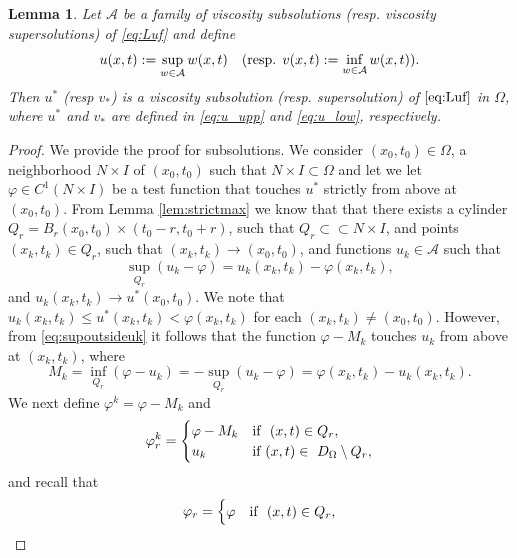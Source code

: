 \documentclass[11pt]{article}
\providecommand{\Ns}{N \times I}
\providecommand{\Rnp}{D_{\Omega}}
\newtheorem{lem}[thm]{Lemma}
\numberwithin{equation}{section}
\theoremstyle{definition}
\begin{document}
\begin{lem}\label{lem:supsubissub}
    Let $\mathcal{A}$ be a family of viscosity subsolutions (resp. viscosity supersolutions) of \eqref{eq:Luf} and define 
    \begin{equation}\label{eq:sup_u}
        u(x,t):= \sup_{w \in \mathcal{A}} w(x,t) \quad (\textup{resp. } v(x,t):= \inf_{w \in \mathcal{A}} w(x,t) ).
    \end{equation}
Then $u^*$ (resp $v_*$) is a viscosity subsolution (resp. supersolution) of $\eqref{eq:Luf}$ in $\Omega$, where $u^*$ and $v_*$ are defined in \eqref{eq:u_upp} and \eqref{eq:u_low}, respectively.
\end{lem}
\begin{proof}
    We provide the proof for subsolutions. We consider $(x_0, t_0) \in \Omega$, a neighborhood $\Ns$ of $(x_0,t_0)$ such that $ \Ns \subset \Omega$ and let we let $\varphi \in C^1(\Ns)$ be a test function that touches $u^*$ strictly from above at $(x_0,t_0)$. From Lemma \ref{lem:strictmax} we know that that there exists a cylinder $Q_r=B_r(x_0,t_0) \times (t_0-r,t_0+r)$, such that $Q_r \subset \subset \Ns$, and points $(x_k,t_k) \in Q_r$, such that $(x_k,t_k)\to (x_0, t_0)$, and functions $u_k \in \mathcal{A}$ such that 
  \begin{equation}\label{eq:supoutsideuk}
         \sup_{Q_r } (u_k-\varphi) = u_k(x_k,t_k)-\varphi(x_k,t_k),
    \end{equation}
     and $u_k(x_k,t_k) \to u^*(x_0, t_0)$. We note that $u_k(x_k,t_k)\leq u^*(x_k,t_k) < \varphi(x_k,t_k)$ for each $(x_k,t_k) \neq (x_0,t_0)$. However, from \eqref{eq:supoutsideuk} it follows that the function $\varphi-M_k$ touches $u_k$ from above at $(x_k,t_k)$, where
     $$
     M_k = \inf_{Q_r} (\varphi-u_k) = -\sup_{Q_r } (u_k-\varphi) = \varphi(x_k,t_k)-u_k(x_k,t_k).
     $$
     We next define $\varphi^k=\varphi-M_k$ and
    \begin{align*}
     \varphi_{r }^k= \begin{cases}
                      \varphi-M_k & \textup{if  } \ (x,t) \in Q_r ,\\
                      u_k & \textup{if  } (x,t) \in \ \Rnp \setminus Q_r,
            \end{cases}
 \end{align*}
and recall that 
\begin{align*}
     \varphi_{r }= \begin{cases}
                      \varphi & \textup{if  } \ (x,t) \in Q_r ,\\

\end{cases}
\end{align*}
\end{proof}
\end{document}
